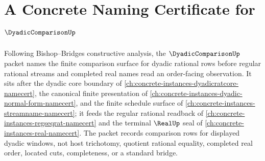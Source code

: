 \chapter{A Concrete Naming Certificate for $\DyadicComparisonUp$}
\label{ch:concrete-instances-dyadic-comparison-namecert}

Following Bishop--Bridges constructive analysis, the $\DyadicComparisonUp$ packet names the finite comparison surface for dyadic rational rows before regular rational streams and completed real names read an order-facing observation. It sits after the dyadic core boundary of \autoref{ch:concrete-instances-dyadicratcore-namecert}, the canonical finite presentation of \autoref{ch:concrete-instances-dyadic-normal-form-namecert}, and the finite schedule surface of \autoref{ch:concrete-instances-streamname-namecert}; it feeds the regular rational readback of \autoref{ch:concrete-instances-regseqrat-namecert} and the terminal $\RealUp$ seal of \autoref{ch:concrete-instances-real-namecert}. The packet records comparison rows for displayed dyadic windows, not host trichotomy, quotient rational equality, completed real order, located cuts, completeness, or a standard bridge.

